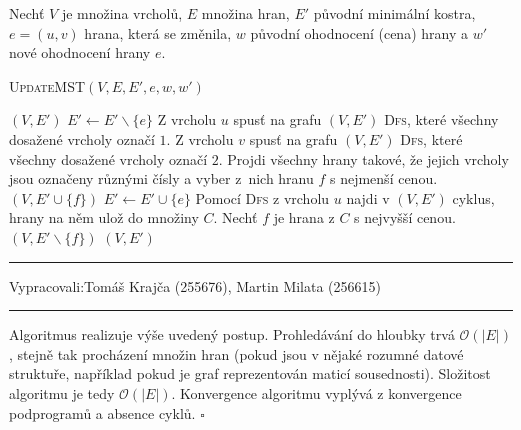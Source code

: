 \documentclass[12pt]{article}
\newcommand{\la}{\leftarrow}
\renewcommand{\O}{\mathcal{O}}
\newcommand{\zadani}[2]{
{\large
\noindent {\bf IB108 \hfill{} Sada #1, Příklad #2 \\[-4mm]}
\noindent\hrule
\vspace{2mm}
\noindent Vypracovali:\hfill{}Tomáš Krajča (255676), Martin Milata (256615)
\vspace{3mm}
\hrule
\bigskip\bigskip}
}
\begin{document}
Nechť $V$ je množina vrcholů, $E$ množina hran, $E'$ původní minimální kostra, $e=(u,v)$ hrana, která
se změnila, $w$ původní ohodnocení (cena) hrany a $w'$ nové ohodnocení hrany $e$.

\begin{algorithm}
\textsc{UpdateMST}$(V, E, E', e, w, w')$
\begin{algorithmic}[1]
	\RETURN $(V,E')$
	\STATE $E' \la E' \smallsetminus \{e\}$
	\STATE Z vrcholu $u$ spusť na grafu $(V,E')$ \textsc{Dfs}, které všechny dosažené vrcholy označí $1$.
	\STATE Z vrcholu $v$ spusť na grafu $(V,E')$ \textsc{Dfs}, které všechny dosažené vrcholy označí $2$.
	\STATE Projdi všechny hrany takové, že jejich vrcholy jsou označeny různými čísly a vyber z~nich hranu $f$ s nejmenší cenou.
	\RETURN $(V,E' \cup \{f\})$
	\STATE $E' \la E' \cup \{e\}$
	\STATE Pomocí \textsc{Dfs} z vrcholu $u$ najdi v $(V,E')$ cyklus, hrany na něm ulož do množiny $C$.
	\STATE Nechť $f$ je hrana z $C$ s nejvyšší cenou.
	\RETURN $(V,E' \smallsetminus \{f\})$
	\RETURN $(V,E')$
\ENDIF
\end{algorithmic}
\end{algorithm}

\clearpage
\zadani{3}{4}
\noindent
Algoritmus realizuje výše uvedený postup. Prohledávání do hloubky trvá $\O(|E|)$, stejně tak procházení množin hran
(pokud jsou v nějaké rozumné datové struktuře, například pokud je graf reprezentován maticí sousednosti). Složitost
algoritmu je tedy $\O(|E|)$. Konvergence algoritmu vyplývá z konvergence podprogramů a absence
cyklů. \hfill$\square$
\end{document}
